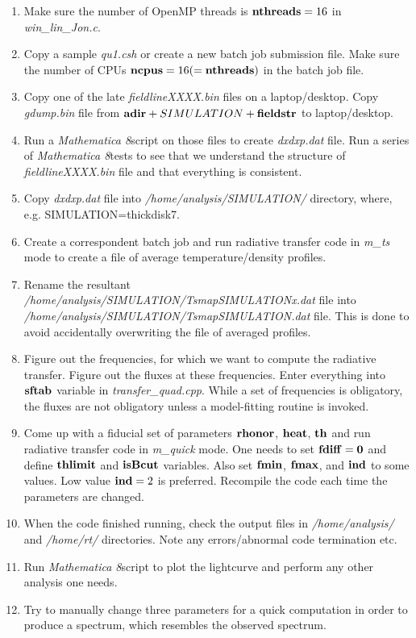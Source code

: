 \documentclass{emulateapj}
\newcommand{\mat}{\textit{Mathematica 8}}
\begin{document}
\begin{enumerate}
\item{Make sure the number of OpenMP threads is ${\bf nthreads}=16$ in \textit{win\_lin\_Jon.c}.}
\item{Copy a sample \textit{qu1.csh} or create a new batch job submission file. Make sure the number of CPUs ${\bf ncpus}=16(={\bf nthreads})$ in the batch job file.}
\item{Copy one of the late \textit{fieldlineXXXX.bin} files on a laptop/desktop. Copy \textit{gdump.bin} file from ${\bf adir}+ SIMULATION +{\bf fieldstr}$ to laptop/desktop.}
\item{Run a \mat script on those files to create \textit{dxdxp.dat} file. Run a series of \mat tests to see that we understand the structure of \textit{fieldlineXXXX.bin} file and
that everything is consistent.}
\item{Copy \textit{dxdxp.dat} file into \textit{/home/analysis/SIMULATION/} directory, where, e.g. SIMULATION=thickdisk7.}
\item{Create a correspondent batch job and run radiative transfer code in \textit{m\_ts} mode to create a file of average temperature/density profiles.}
\item{Rename the resultant \textit{/home/analysis/SIMULATION/TsmapSIMULATIONx.dat} file into \textit{/home/analysis/SIMULATION/TsmapSIMULATION.dat} file. This is done to avoid accidentally 
overwriting the file of averaged profiles.}
\item{Figure out the frequencies, for which we want to compute the radiative transfer. Figure out the fluxes at these frequencies. Enter everything into ${\bf sftab}$ variable in
\textit{transfer\_quad.cpp}. While a set of frequencies is obligatory, the fluxes are not obligatory unless a model-fitting routine is invoked.}
\item{Come up with a fiducial set of parameters $\bf rhonor$, $\bf heat$, $\bf th$ and run radiative transfer code in \textit{m\_quick} mode. One needs to set $\bf fdiff=0$ and 
define $\bf thlimit$ and $\bf isBcut$ variables. Also set ${\bf fmin}$, ${\bf fmax}$, and ${\bf ind}$ to some values. Low value ${\bf ind}=2$ is preferred.
Recompile the code each time the parameters are changed.}
\item{When the code finished running, check the output files in \textit{/home/analysis/} and \textit{/home/rt/} directories. Note any errors/abnormal code termination etc.}
\item{Run \mat script to plot the lightcurve and perform any other analysis one needs.}
\item{Try to manually change three parameters for a quick computation in order to produce a spectrum, which resembles the observed spectrum.}

\end{enumerate}
\end{document}
